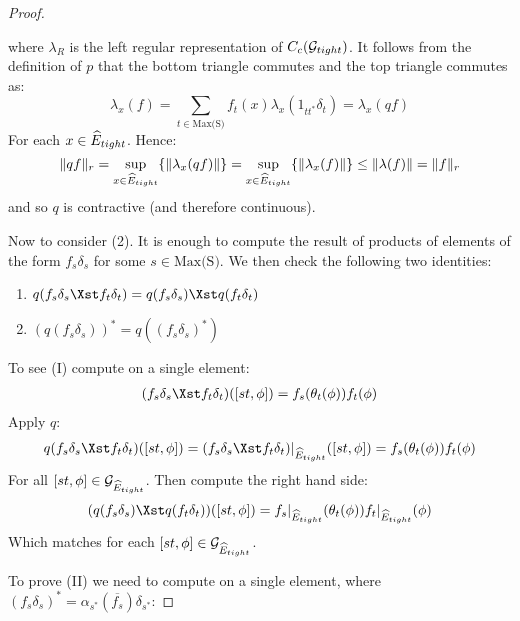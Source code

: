 \begin{corollary}
\begin{proof}
\begin{center}
\begin{tikzpicture}
\end{tikzpicture}
\end{center}

where $\lambda_{R}$ is the left regular representation of $C_{c}(\G_{tight})$. It follows from the definition of $p$ that the bottom triangle commutes and the top triangle commutes as:
\begin{equation*}
\lambda_{x}(f) =\sum_{t \in \text{Max(S)}} f_{t}(x)\lambda_{x}(1_{tt^{*}}\delta_{t}) = \lambda_{x}(qf)
\end{equation*}
For each $x \in \E_{tight}$. Hence:
\begin{equation*}
\Vert qf \Vert_{r} = \sup_{x \in \E_{tight}} \lbrace \Vert \lambda_{x}(qf) \Vert \rbrace = \sup_{x \in \E_{tight}} \lbrace \Vert \lambda_{x}(f) \Vert \rbrace \leq \Vert \lambda(f) \Vert = \Vert f \Vert_{r}
\end{equation*}
and so $q$ is contractive (and therefore continuous).
 
Now to consider (2). It is enough to compute the result of products of elements of the form $f_{s}\delta_{s}$ for some $s \in \text{Max(S)}$. We then check the following two identities:


\begin{enumerate}[I]
\item $q(f_{s}\delta_{s} \Xst f_{t}\delta_{t}) = q(f_{s}\delta_{s})\Xst q(f_{t}\delta_{t})$
\item $(q(f_{s}\delta_{s}))^{*}=q((f_{s}\delta_{s})^{*})$
\end{enumerate}


To see (I) compute on a single element:
\begin{eqnarray*}
(f_{s}\delta_{s} \Xst f_{t}\delta_{t})([st,\phi])=f_{s}(\theta_{t}(\phi))f_{t}(\phi)
\end{eqnarray*}
Apply $q$:
\begin{eqnarray*}
q(f_{s}\delta_{s} \Xst f_{t}\delta_{t})([st,\phi])= (f_{s}\delta_{s} \Xst f_{t}\delta_{t})|_{\E_{tight}}([st,\phi]) =f_{s}(\theta_{t}(\phi))f_{t}(\phi)
\end{eqnarray*}
For all $[st,\phi] \in \G_{\E_{tight}}$. Then compute the right hand side: 
\begin{eqnarray*}
(q(f_{s}\delta_{s}) \Xst q(f_{t}\delta_{t}))([st,\phi])=f_{s}|_{\E_{tight}}(\theta_{t}(\phi))f_{t}|_{\E_{tight}}(\phi)
\end{eqnarray*}
Which matches for each $[st,\phi] \in \G_{\E_{tight}}$. 

To prove (II) we need to compute on a single element, where $(f_{s}\delta_{s})^{*}=\alpha_{s^{*}}(\overline{f_{s}})\delta_{s^{*}}$:


\end{proof}
\end{corollary}
